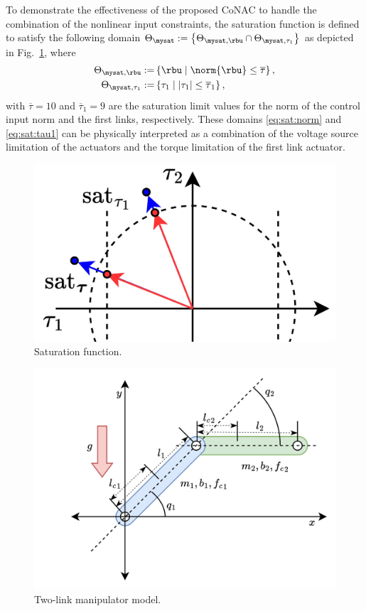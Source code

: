 \documentclass[final,5p,times,twocolumn,authoryear]{elsarticle}
\begin{document}
To demonstrate the effectiveness of the proposed CoNAC to handle the combination of the nonlinear input constraints, the saturation function is defined to satisfy the following domain $\Theta_{\mysat}:=\left\{\Theta_{\mysat, {\rbu}}\cap\Theta_{\mysat, {\tau_1}}\right\}$ as depicted in Fig.~\ref{fig:sat}, where
%
\begin{subequations}
    \begin{align}
        \Theta_{\mysat, {\rbu}}
        :=&
        \left\{
            \rbu
            \mid
            \norm{\rbu} \le \overline\tau
        \right\}
        \label{eq:sat:norm}
        ,
        \\
        \Theta_{\mysat, {\tau_1}}
        :=&
        \left\{
            \tau_1
            \mid
            \vert{\tau_1}\vert \le \overline\tau_1
        \right\}
        ,
        \label{eq:sat:tau1}
    \end{align}
    \label{eq:sat}
\end{subequations}
%
with $\overline\tau=10$ and $\overline\tau_1=9$ are the saturation limit values for the norm of the control input norm and the first links, respectively. 
These domains \ref{eq:sat:norm} and \ref{eq:sat:tau1} can be physically interpreted as a combination of the voltage source limitation of the actuators and the torque limitation of the first link actuator.

\begin{figure}[t]
    \centering
    \includegraphics[width=0.45\linewidth]{
        src/figures/saturation.drawio.pdf
    }
    \caption{Saturation function.}
    \label{fig:sat}
\end{figure}

\begin{figure}[t]
    \centering
    \includegraphics[width=0.75\linewidth]{fig/RobotModel.drawio.png}
    \caption{Two-link manipulator model.}
    \label{fig: manipulator}
\end{figure}
\end{document}
